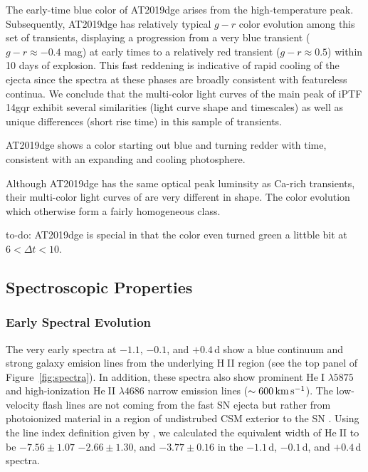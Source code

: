 \documentclass[twocolumn]{aastex63}
\def\ion#1#2{#1$\;${\footnotesize\rm{#2}}\relax}
\newcommand{\todo}[1]{{\color{magenta} to-do: {#1}}}
\begin{document}
\begin{CJK*}{UTF8}{gbsn}
The 
early-time blue color of AT2019dge arises from the high-temperature peak. Subsequently, AT2019dge 
has relatively typical $g-r$ color evolution among this set of transients, displaying a 
progression from a very blue transient ($g-r \approx -0.4$ mag) at early times to a relatively red 
transient ($g-r \approx 0.5$) within 10 days of explosion. This fast reddening is indicative of rapid 
cooling of the ejecta since the spectra at these phases are broadly consistent with featureless 
continua. We conclude that the multi-color light curves of the main peak of iPTF 14gqr exhibit several 
similarities (light curve shape and timescales) as well as unique differences (short rise time) in this 
sample of transients.

AT2019dge shows a color starting out blue and turning redder with time, consistent with an expanding 
and cooling photosphere.

Although AT2019dge has the same optical peak luminsity as Ca-rich transients, their multi-color light 
curves of are very different in shape. The color evolution  which otherwise form a fairly homogeneous 
class. 

\todo{AT2019dge is special in that the color even turned green a littble bit at $6<\Delta t<10$.}


\subsection{Spectroscopic Properties}\label{subsec:spec_properties}
\subsubsection{Early Spectral Evolution}

The very early spectra at $-1.1$, $-0.1$, and $+0.4$\,d show a blue continuum and strong galaxy 
emision lines from the underlying \ion{H}{II} region (see the top panel of Figure~\ref{fig:spectra}). In 
addition, these spectra also show prominent \ion{He}{I} $\lambda5875$ and high-ionization \ion{He}{II} 
$\lambda4686$ narrow emission lines ($\sim 600\,{\rm km\,s^{-1}}$). The low-velocity flash lines are 
not coming from the fast SN ejecta but rather from photoionized material in a region of undistrubed 
CSM exterior to the SN \citep{Leonard2000}. Using the line index definition given by 
\citet{Khazov2016}, we calculated the equivalent width of \ion{He}{II} to be $-7.56\pm 1.07$ $-2.66\pm 
1.30$, and $-3.77\pm 0.16$ in the $-1.1$\,d, $-0.1$\,d, and $+0.4$\,d spectra.


\end{CJK*}
\end{document}
